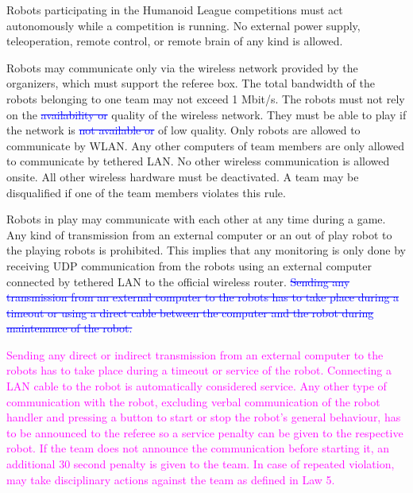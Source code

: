 \headlinebox

Robots participating in the Humanoid League competitions must act autonomously while a competition is running. No external power supply, teleoperation, remote control, or remote brain of any kind is allowed.

\bigskip

Robots may communicate only via the wireless network provided by the organizers, which must support the referee box. The total bandwidth of the robots belonging to one team may not exceed 1 Mbit/s. The robots must not rely on the \textcolor{blue}{\sout{availability or}} quality of the wireless network. They
must be able to play if the network is \textcolor{blue}{\sout{not available or}} of low quality. Only robots are allowed to communicate by WLAN. Any other computers of team members are only allowed to communicate by tethered LAN. No other wireless communication is allowed onsite. All other wireless hardware must be deactivated. A team may be disqualified if one of the team members violates this rule.

\bigskip

Robots in play may communicate with each other at any time during a game. Any kind of transmission from an external computer or an out of play robot to the playing robots is prohibited. This implies that any monitoring is only done by receiving UDP communication from the robots using an external computer connected by tethered LAN to the official wireless router. \textcolor{blue}{\sout{Sending any transmission from an external computer to the robots has to take place during a timeout or using a direct cable between the computer and the robot during maintenance of the robot.}}

\bigskip

\textcolor{magenta}{Sending any direct or indirect transmission from an external computer to the robots has to take place during a timeout or service of the robot. Connecting a LAN cable to the robot is automatically considered service. Any other type of communication with the robot, excluding verbal communication of the robot handler and pressing a button to start or stop the robot's general behaviour, has to be announced to the referee so a service penalty can be given to the respective robot. If the team does not announce the communication before starting it, an additional 30 second penalty is given to the team. In case of repeated violation, may take disciplinary actions against the team as defined in Law 5.}
\bigskip

